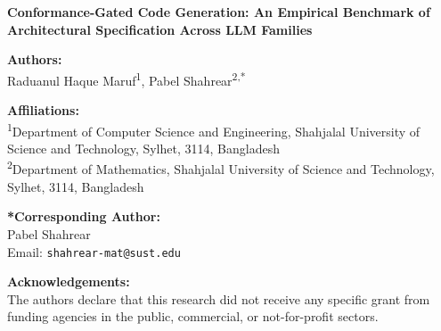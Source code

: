 \documentclass[12pt,a4paper]{article}
\begin{document}
\begin{center}
    \LARGE \textbf{Conformance-Gated Code Generation: An Empirical Benchmark of Architectural Specification Across LLM Families}
\end{center}

\vspace{1cm}

\noindent \textbf{Authors:} \\
Raduanul Haque Maruf\textsuperscript{1}, Pabel Shahrear\textsuperscript{2,*}

\vspace{0.5cm}

\noindent \textbf{Affiliations:} \\
\textsuperscript{1}Department of Computer Science and Engineering, Shahjalal University of Science and Technology, Sylhet, 3114, Bangladesh \\
\textsuperscript{2}Department of Mathematics, Shahjalal University of Science and Technology, Sylhet, 3114, Bangladesh

\vspace{0.5cm}

\noindent \textbf{*Corresponding Author:} \\
Pabel Shahrear \\
Email: \texttt{shahrear-mat@sust.edu}

\vspace{1.5cm}

\noindent \textbf{Acknowledgements:} \\
The authors declare that this research did not receive any specific grant from funding agencies in the public, commercial, or not-for-profit sectors. 
\end{document}
